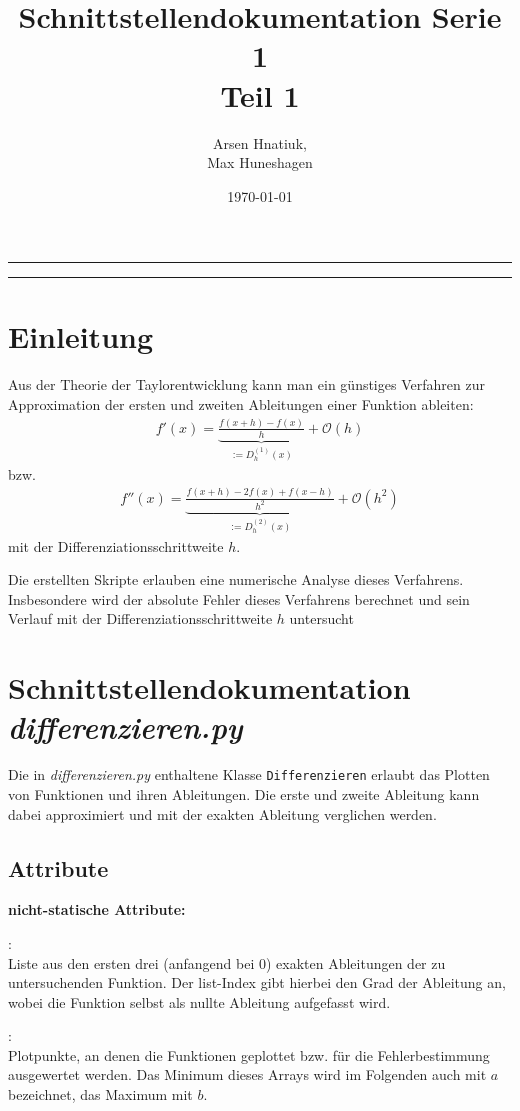 \documentclass[smallheadings]{scrartcl}
\title{Schnittstellendokumentation Serie 1\\Teil 1}
\author{%
  Arsen Hnatiuk,\\%
  Max Huneshagen 
}
\date{\today}
\newcommand{\initem}[2]{\item[\hspace{0.5em} {\normalfont\ttfamily{#1}} {\normalfont\itshape{(#2)}}]}
\begin{document}
\maketitle
\tableofcontents
\bigskip

\hrule
\hrule


\section{Einleitung}

Aus der Theorie der Taylorentwicklung kann man ein günstiges Verfahren zur Approximation der ersten und zweiten Ableitungen einer Funktion ableiten: 
\begin{align}
\label{eq:1_abl}
f'(x)=\underbrace{\frac{f(x+h)-f(x)}{h}}_{:=D_h^{(1)}(x)}+\mathcal{O}(h)
\end{align}
bzw.
\begin{align}
\label{eq:2_abl}
f''(x)=\underbrace{\frac{f(x+h)-2f(x)+f(x-h)}{h^2}}_{:=D_h^{(2)}(x)}+\mathcal{O}(h^2)
\end{align}
mit der Differenziationsschrittweite $h$.

Die erstellten Skripte erlauben eine numerische Analyse dieses Verfahrens. Insbesondere wird der absolute Fehler dieses Verfahrens berechnet und sein Verlauf mit der Differenziationsschrittweite $h$ untersucht

\section{Schnittstellendokumentation \emph{differenzieren.py}}

Die in \emph{differenzieren.py} enthaltene Klasse \texttt{Differenzieren} erlaubt das Plotten von Funktionen und ihren Ableitungen. Die erste und zweite Ableitung kann dabei approximiert und mit der exakten Ableitung verglichen werden.

\subsection{Attribute}

\textbf{nicht-statische Attribute:}\\

\begin{compactdesc}
	\initem{ablex\_lis}{list}:~\\   Liste aus den ersten drei (anfangend bei 0) exakten Ableitungen der
            zu untersuchenden Funktion. Der list-Index gibt hierbei den Grad der
            Ableitung an, wobei die Funktion selbst als nullte Ableitung aufgefasst wird.
	      \initem{p\_arr}{numpy.ndarray aus floats}:~\\ Plotpunkte, an denen die Funktionen geplottet bzw. für die Fehlerbestimmung ausgewertet werden. Das Minimum dieses Arrays wird im Folgenden auch mit $a$ bezeichnet, das Maximum mit $b$.
\end{compactdesc}
\end{document}
